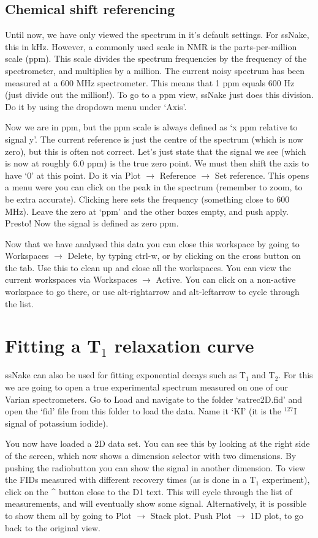 \documentclass[11pt,a4paper]{article}
\begin{document}
\subsection{Chemical shift referencing}
Until now, we have only viewed the spectrum in it's default settings. For ssNake, this in kHz. However, a commonly used scale in NMR is the parts-per-million scale (ppm). This scale divides the spectrum frequencies by the frequency of the spectrometer, and multiplies by a million. The current noisy spectrum has been measured at a 600 MHz spectrometer. This means that 1 ppm equals 600 Hz (just divide out the million!). To go to a ppm view, ssNake just does this division. Do it by using the dropdown menu under `Axis'.

Now we are in ppm, but the ppm scale is always defined as `x ppm relative to signal y'. The current reference is just the centre of the spectrum (which is now zero), but this is often not correct. Let's just state that the signal we see (which is now at roughly 6.0 ppm) is the true zero point. We must then shift the axis to have `0' at this point. Do it via Plot $\rightarrow$ Reference $\rightarrow$ Set reference. This opens a menu were you can click on the peak in the spectrum (remember to zoom, to be extra accurate). Clicking here sets the frequency (something close to 600 MHz). Leave the zero at `ppm' and the other boxes empty, and push apply. Presto! Now the signal is defined as zero ppm.

Now that we have analysed this data you can close this workspace by going to Workspaces $\rightarrow$ Delete, by typing ctrl-w, or by clicking on the cross button on the tab. Use this to clean up and close all the workspaces. You can view the current workspaces via Workspaces $\rightarrow$ Active. You can click on a non-active workspace to go there, or use alt-rightarrow and alt-leftarrow to cycle through the list.

\section{Fitting a T$_1$ relaxation curve}
ssNake can also be used for fitting exponential decays such as T$_1$ and T$_2$. For this we are going to open a true experimental spectrum measured on one of our Varian spectrometers. Go to Load and navigate to the folder `satrec2D.fid' and open the `fid' file from this folder to load the data. Name it `KI' (it is the $^{127}$I signal of potassium iodide).

You now have loaded a 2D data set. You can see this by looking at the right side of the screen, which now shows a dimension selector with two dimensions. By pushing the radiobutton you can show the signal in another dimension. To view the FIDs measured with different recovery times (as is done in a T$_1$ experiment), click on the \^{} button close to the D1 text. This will cycle through the list of measurements, and will eventually show some signal. Alternatively, it is possible to show them all by going to Plot $\rightarrow$ Stack plot. Push Plot $\rightarrow$ 1D plot, to go back to the original view.
\end{document}

